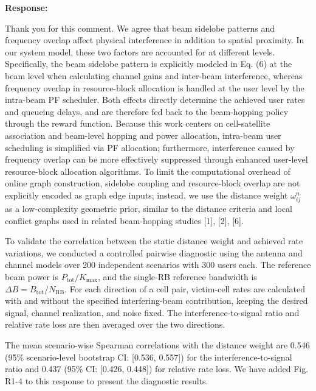 \documentclass[11pt,a4paper]{article}
\begin{document}
\textbf{Response:}\par

Thank you for this comment. We agree that beam sidelobe patterns and frequency overlap affect physical interference in addition to spatial proximity. In our system model, these two factors are accounted for at different levels. Specifically, the beam sidelobe pattern is explicitly modeled in Eq. (6) at the beam level when calculating channel gains and inter-beam interference, whereas frequency overlap in resource-block allocation is handled at the user level by the intra-beam PF scheduler. Both effects directly determine the achieved user rates and queueing delays, and are therefore fed back to the beam-hopping policy through the reward function. Because this work centers on cell-satellite association and beam-level hopping and power allocation, intra-beam user scheduling is simplified via PF allocation; furthermore, interference caused by frequency overlap can be more effectively suppressed through enhanced user-level resource-block allocation algorithms. To limit the computational overhead of online graph construction, sidelobe coupling and resource-block overlap are not explicitly encoded as graph edge inputs; instead, we use the distance weight $\omega_{ij}^n$ as a low-complexity geometric prior, similar to the distance criteria and local conflict graphs used in related beam-hopping studies [1], [2], [6].
\par

To validate the correlation between the static distance weight and achieved rate variations, we conducted a controlled pairwise diagnostic using the antenna and channel models over 200 independent scenarios with 300 users each. The reference beam power is $P_{\mathrm{tot}}/K_{\max}$, and the single-RB reference bandwidth is $\Delta B=B_{\mathrm{tot}}/N_{\mathrm{RB}}$. For each direction of a cell pair, victim-cell rates are calculated with and without the specified interfering-beam contribution, keeping the desired signal, channel realization, and noise fixed. The interference-to-signal ratio and relative rate loss are then averaged over the two directions.
\par

The mean scenario-wise Spearman correlations with the distance weight are 0.546 (95\% scenario-level bootstrap CI: [0.536, 0.557]) for the interference-to-signal ratio and 0.437 (95\% CI: [0.426, 0.448]) for relative rate loss. We have added Fig. R1-4 to this response to present the diagnostic results.
\par
\end{document}
